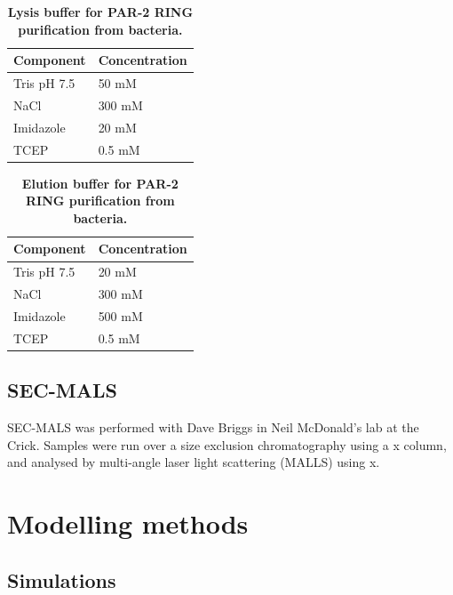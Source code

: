 \documentclass[12pt]{"report"}
\newcommand{\mycaption}[2]{\caption[#1]{\textbf{#1.} #2}}
\begin{document}
\begin{table}[]
\footnotesize
\begin{tabular}{|l|l|}
\hline
\textbf{Component} & \textbf{Concentration} \\ \hline
Tris pH 7.5 & 50 mM \\ \hline
NaCl & 300 mM \\ \hline
Imidazole & 20 mM \\ \hline
TCEP & 0.5 mM \\ \hline
\end{tabular}
\mycaption{Lysis buffer for PAR-2 RING purification from bacteria}{}
\label{table:ecoli_lysis_buffer}
\end{table}

\begin{table}[]
\footnotesize
\begin{tabular}{|l|l|}
\hline
\textbf{Component} & \textbf{Concentration} \\ \hline
Tris pH 7.5 & 20 mM \\ \hline
NaCl & 300 mM \\ \hline
Imidazole & 500 mM \\ \hline
TCEP & 0.5 mM \\ \hline
\end{tabular}
\mycaption{Elution buffer for PAR-2 RING purification from bacteria}{}
\label{table:ecoli_elution_buffer}
\end{table}


\subsection{SEC-MALS}

SEC-MALS was performed with Dave Briggs in Neil McDonald's lab at the Crick. Samples were run over a size exclusion chromatography using a x column, and analysed by multi-angle laser light scattering (MALLS) using x. \\


\section{Modelling methods}

\subsection{Simulations}

\end{document}
